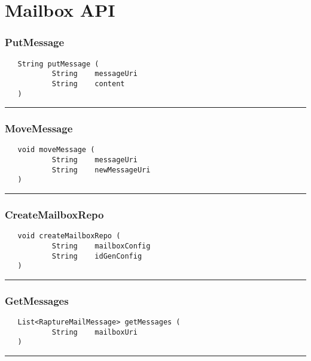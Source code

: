 \chapter{Mailbox API}

\subsection{PutMessage}
\label{Api:PutMessage}
\begin{verbatim}
   String putMessage (
           String    messageUri
           String    content
   )
\end{verbatim}



\rule{15cm}{2pt}
\subsection{MoveMessage}
\label{Api:MoveMessage}
\begin{verbatim}
   void moveMessage (
           String    messageUri
           String    newMessageUri
   )
\end{verbatim}



\rule{15cm}{2pt}
\subsection{CreateMailboxRepo}
\label{Api:CreateMailboxRepo}
\begin{verbatim}
   void createMailboxRepo (
           String    mailboxConfig
           String    idGenConfig
   )
\end{verbatim}



\rule{15cm}{2pt}
\subsection{GetMessages}
\label{Api:GetMessages}
\begin{verbatim}
   List<RaptureMailMessage> getMessages (
           String    mailboxUri
   )
\end{verbatim}



\rule{15cm}{2pt}

